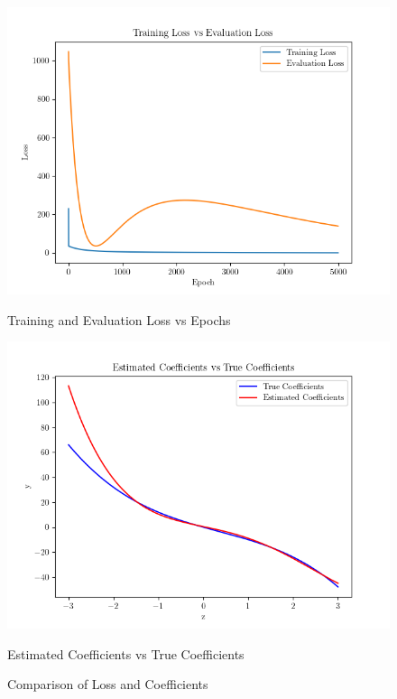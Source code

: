 \documentclass[a4paper]{article}
\begin{document}
\begin{enumerate}
	      \begin{figure}[H]
		      \centering
		      \begin{minipage}{0.45\textwidth}
			      \centering
			      \includegraphics[width=\linewidth]{../Graph/Training-Evaluation-Loss2.png}
			      \caption{Training and Evaluation Loss vs Epochs}
			      \label{fig:question9a}
		      \end{minipage}
		      \hfill
		      \begin{minipage}{0.45\textwidth}
			      \centering
			      \includegraphics[width=\linewidth]{../Graph/Estimated-True-Coefficients2.png}
			      \caption{Estimated Coefficients vs True Coefficients}
			      \label{fig:question9b}
		      \end{minipage}
		      \caption{Comparison of Loss and Coefficients}
		      \label{fig:question9}
	      \end{figure}


\end{enumerate}
\end{document}

